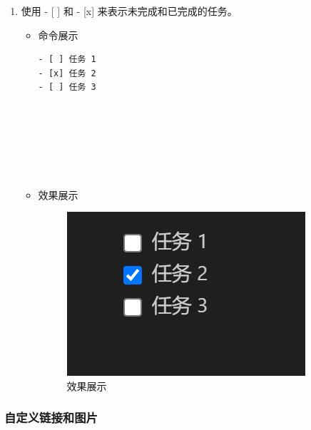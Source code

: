 \documentclass[UTF8]{ctexart}
\begin{document}
\begin{enumerate}
  \item 使用 - [ ] 和 - [x] 来表示未完成和已完成的任务。
  \begin{itemize}
  \item 命令展示
  \begin{verbatim}- [ ] 任务 1
- [x] 任务 2
- [ ] 任务 3







  \end{verbatim}

\item 效果展示
 \begin{figure}[H]
    \centering
    \includegraphics[width=\textwidth]{44} %
    \caption{效果展示}
  \end{figure}
  \end{itemize}
\end{enumerate}


\subsubsection{自定义链接和图片}
\end{document}
